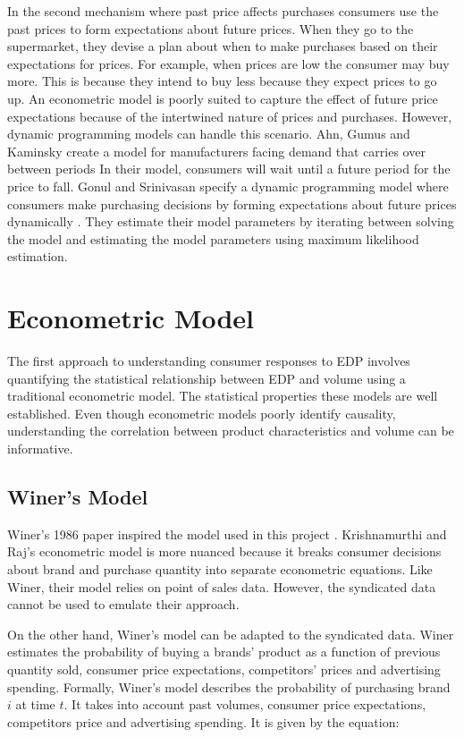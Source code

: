 \documentclass{article}
\begin{document}
In the second mechanism where past price affects purchases consumers use the past prices to form expectations about future prices. When they go to the supermarket, they devise a plan about when to make purchases based on their expectations for prices. For example, when prices are low the consumer may buy more. This is because they intend to buy less because they expect prices to go up. An econometric model is poorly suited to capture the effect of future price expectations because of the intertwined nature of prices and purchases. However, dynamic programming models can handle this scenario.   Ahn, Gumus and Kaminsky create a model for manufacturers facing demand that carries over between periods \cite{ahn}  In their model, consumers will wait until a future period for the price to fall. Gonul and Srinivasan specify a dynamic programming model where consumers make purchasing decisions by forming expectations about future prices dynamically \cite{gonul}. They estimate their model parameters by iterating between solving the model and estimating the model parameters using maximum likelihood estimation.

\section{Econometric Model}

The first approach to understanding consumer responses to EDP involves quantifying the statistical relationship between EDP and volume using a traditional econometric model. The statistical properties these models are well established. Even though econometric models poorly identify causality, understanding the correlation between product characteristics and volume can be informative.

\subsection{Winer's Model}

Winer's 1986 paper inspired the model used in this project \cite{winer}. Krishnamurthi and Raj's econometric model is more nuanced because it breaks consumer decisions about brand and purchase quantity into separate econometric equations. Like Winer, their model relies on point of sales data. However, the syndicated data cannot be used to emulate their approach. 

On the other hand, Winer's model can be adapted to the syndicated data. Winer estimates the probability of buying a brands' product as a function of previous quantity sold, consumer price expectations, competitors' prices and advertising spending. Formally, Winer's model describes the probability of purchasing brand $i$ at time $t$. It takes into account past volumes, consumer price expectations, competitors price and advertising spending. It is given by the equation: \\
\end{document}
